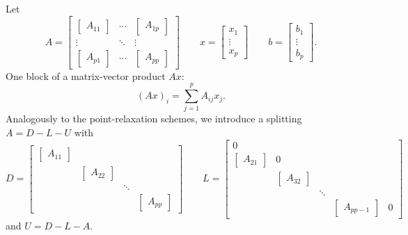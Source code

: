 Let
\[
A = \begin{bmatrix}
\begin{bmatrix}
A_{11}
\end{bmatrix}
&\cdots & 
\begin{bmatrix}
A_{1p}
\end{bmatrix} \\
\vdots &\ddots& \vdots\\
\begin{bmatrix}
A_{p1}
\end{bmatrix}
&\cdots & 
\begin{bmatrix}
A_{pp}
\end{bmatrix}
\end{bmatrix}
\qquad
x = \begin{bmatrix}
x_1 \\ \vdots \\ x_{p}
\end{bmatrix}
\qquad
b = \begin{bmatrix}
b_1 \\ \vdots \\ b_{p}
\end{bmatrix}
.\] 
One block of a matrix-vector product $Ax$:
\[
	(Ax)_{i} =  \sum_{j=1}^{p}{A_{ij}x_{j}}
.\] 
Analogously to the point-relaxation schemes, we introduce a splitting $A = D-L-U$ with
\[
D=
\begin{bmatrix}
	\begin{bmatrix}
	A_{11}
	\end{bmatrix}
	\\
	&\begin{bmatrix}
	A_{22}
	\end{bmatrix}
	\\
	&&\ddots
	\\
	&&&\begin{bmatrix}
	A_{pp}
	\end{bmatrix}
\end{bmatrix}
\qquad
L = \begin{bmatrix}
0 \\
\begin{bmatrix}
	A_{21}
\end{bmatrix}
& 0 \\
&\begin{bmatrix}
A_{32}
\end{bmatrix}
\\
&&\ddots \\
&&&\begin{bmatrix}
A_{p p-1}
\end{bmatrix}
& 0
\end{bmatrix}
\] 
and $U=D-L-A$.

